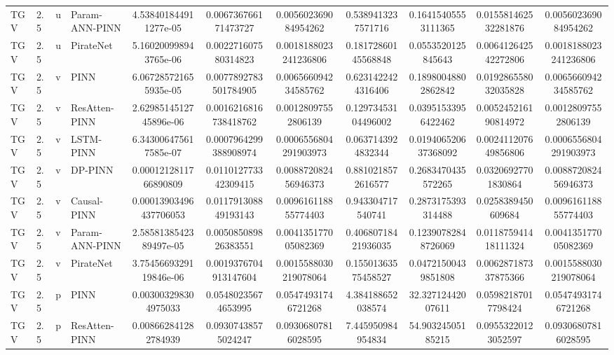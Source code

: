 \begin{landscape}
\begin{longtable}{llllccccccc}
 TGV &    2.5 &     u & Param-ANN-PINN &  4.538401844911277e-05 &   0.006736766171473727 &   0.005602369084954262 &   0.5389413237571716 &   0.16415405553111365 &  0.015581462532281876 &   0.005602369084954262 \\
 TGV &    2.5 &     u &      PirateNet &  5.160200998943765e-06 &   0.002271607580314823 &  0.0018188023241236806 &  0.18172860145568848 &    0.0553520125845643 &  0.006412642542272806 &  0.0018188023241236806 \\
 TGV &    2.5 &     v &           PINN &  6.067285721655935e-05 &  0.0077892783501784905 &   0.006566094234585762 &   0.6231422424316406 &   0.18980048802862842 &  0.019286558032035828 &   0.006566094234585762 \\
 TGV &    2.5 &     v &  ResAtten-PINN & 2.6298514512745896e-06 &  0.0016216816738418762 &    0.00128097552806139 &  0.12973453104496002 &   0.03951533956422462 &  0.005245216190814972 &    0.00128097552806139 \\
 TGV &    2.5 &     v &      LSTM-PINN &  6.343006475617585e-07 &  0.0007964299388908974 &  0.0006556804291903973 &   0.0637143924832344 &  0.019406520637368092 &  0.002411207649856806 &  0.0006556804291903973 \\
 TGV &    2.5 &     v &        DP-PINN &  0.0001212811766890809 &   0.011012773342309415 &   0.008872082456946373 &   0.8810218572616577 &    0.2683470435572265 &   0.03206927701830864 &   0.008872082456946373 \\
 TGV &    2.5 &     v &    Causal-PINN & 0.00013903496437706053 &   0.011791308849193143 &   0.009616118855774403 &    0.943304717540741 &    0.2873175393314488 &    0.0258389450609684 &   0.009616118855774403 \\
 TGV &    2.5 &     v & Param-ANN-PINN & 2.5858138542389497e-05 &   0.005085089826383551 &   0.004135177005082369 &  0.40680718421936035 &   0.12390782848726069 &  0.011875941418111324 &   0.004135177005082369 \\
 TGV &    2.5 &     v &      PirateNet & 3.7545669329119846e-06 &  0.0019376704913147604 &  0.0015588030219078064 &  0.15501363575458527 &   0.04721500439851808 &  0.006287187337875366 &  0.0015588030219078064 \\
 TGV &    2.5 &     p &           PINN &   0.003003298304975033 &    0.05480235674653995 &    0.05474931746721268 &    4.384188652038574 &     32.32712442007611 &   0.05982187017798424 &    0.05474931746721268 \\
 TGV &    2.5 &     p &  ResAtten-PINN &   0.008662841282784939 &    0.09307438575024247 &    0.09306807816028595 &    7.445950984954834 &     54.90324505185215 &   0.09553220123052597 &    0.09306807816028595 \\

\end{longtable}
\end{landscape}
